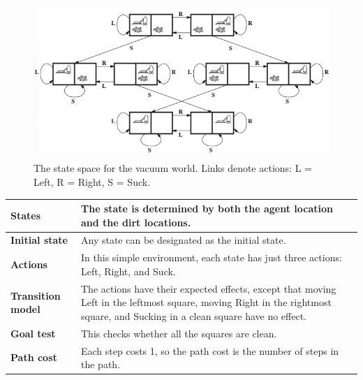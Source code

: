 \begin{figure}[H]
    \centering
    \includegraphics[width=\linewidth, height=6cm, keepaspectratio]{Pictures/ai-ml/vaccum-toy-states.png}
    \caption*{The state space for the vacuum world. Links denote actions: L = Left, R = Right, S = Suck.}
\end{figure}

\begin{customTableWrapper}{1.3}
\begin{longtable}{|p{3cm} p{10cm}|}
    \hline\endfirsthead
    \hline\endhead
    \hline\endfoot
    \hline\endlastfoot

    \textbf{States} & The state is determined by both the agent location and the dirt locations. \\ 
    \hline

    \textbf{Initial state} & Any state can be designated as the initial state.\\
    \hline

    \textbf{Actions} & In this simple environment, each state has just three actions: Left, Right, and Suck.\\
    \hline

    \textbf{Transition model} & The actions have their expected effects, except that moving Left in the leftmost square, moving Right in the rightmost square, and Sucking in a clean square have no effect. \\
    \hline

    \textbf{Goal test} & This checks whether all the squares are clean.\\
    \hline

    \textbf{Path cost} & Each step costs 1, so the path cost is the number of steps in the path.\\
    \hline
\end{longtable}
\end{customTableWrapper}

